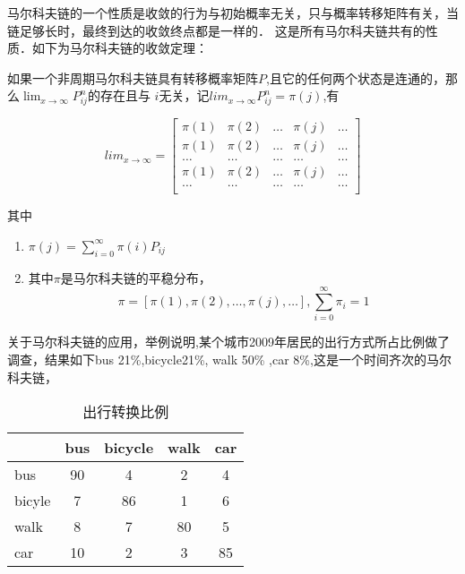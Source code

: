     马尔科夫链的一个性质是收敛的行为与初始概率无关，只与概率转移矩阵有关，当链足够长时，最终到达的收敛终点都是一样的．
这是所有马尔科夫链共有的性质．如下为马尔科夫链的收敛定理：
    
    如果一个非周期马尔科夫链具有转移概率矩阵$P$,且它的任何两个状态是连通的，那么$\lim_{x \rightarrow \infty} P_{ij}^{n}$的存在且与
$i$无关，记$lim_{x \rightarrow \infty}P_{ij}^{n}=\pi(j)$,有

    \begin{displaymath}
        lim_{x\to\infty} = \left[
\begin{array}{ccccc}
\pi(1) & \pi(2) & \ldots & \pi(j) & \ldots \\
\pi(1) & \pi(2) &  \ldots & \pi(j) & \ldots \\
 \ldots& \ldots& \ldots& \ldots& \ldots \\
\pi(1) & \pi(2) &  \ldots & \pi(j) & \ldots \\
 \ldots& \ldots& \ldots& \ldots& \ldots \\
\end{array} \right]
    \end{displaymath}

    其中
    \begin{enumerate}
    \item $\pi(j)=\sum_{i=0}^{\infty}\pi(i) P_{ij}$
    \item 其中$\pi$是马尔科夫链的平稳分布，$$\pi = [\pi(1),\pi(2),\ldots,\pi(j),\ldots],\sum_{i=0}^{\infty}\pi_i=1$$
    \end{enumerate}
    \vspace{1ex}

    关于马尔科夫链的应用，举例说明,某个城市2009年居民的出行方式所占比例做了调查，结果如下bus 21\%,bicycle21\%,
walk 50\% ,car 8\%,这是一个时间齐次的马尔科夫链，

    \begin{table}[htbp]
    \centering  %
    \begin{tabular}{lcccc}  %
    \hline
    &bus&bicycle&walk&car\\ \hline  %
    bus&90&4&2&4\\
    bicyle&7&86&1&6\\
    walk&8&7&80&5\\
    car&10&2&3&85\\ \hline
    \end{tabular}
    \caption{出行转换比例}
    \end{table}
    

